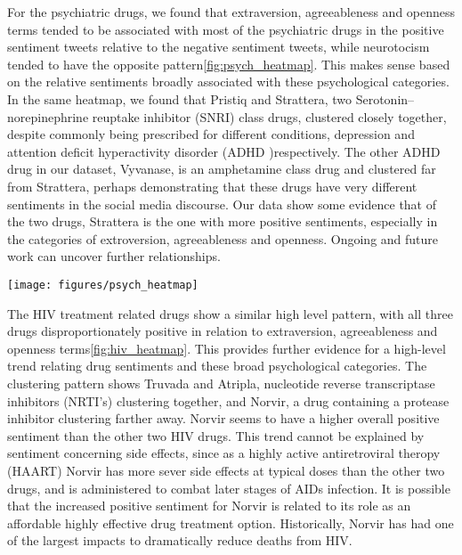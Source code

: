 For the psychiatric drugs, we found that extraversion, agreeableness and openness terms tended to be associated with most of the psychiatric drugs in the positive sentiment tweets relative to the negative sentiment tweets, while neurotocism tended to have the opposite pattern\ref{fig:psych_heatmap}. This makes sense based on the relative sentiments broadly associated with these psychological categories. In the same heatmap, we found that Pristiq and Strattera, two Serotonin–norepinephrine reuptake inhibitor (SNRI) class drugs\cite{howland2010potential}, clustered closely together, despite commonly being prescribed for different conditions, depression and attention deficit hyperactivity disorder (ADHD )respectively. The other ADHD drug in our dataset, Vyvanase, is an amphetamine class drug and clustered far from Strattera, perhaps demonstrating that these drugs have very different sentiments in the social media discourse. Our data show some evidence that of the two drugs, Strattera is the one with more positive sentiments, especially in the categories of extroversion, agreeableness and openness. Ongoing and future work can uncover further relationships.

\begin{figure*}
\centering
\texttt{[image: figures/psych\_heatmap]}
\caption{Relative similarity for psychiatric drug and personality keywords for positive sentiment tweets relative to negative sentiment tweets. The top 5 personality keywords associated with each of the following big 5 categories are shown in order: extraversion, agreeableness, conscientiousness, openness, neuroticism.}
\label{fig:psych_heatmap}
\end{figure*}

The HIV treatment related drugs show a similar high level pattern, with all three drugs disproportionately positive in relation to extraversion, agreeableness and openness terms\ref{fig:hiv_heatmap}. This provides further evidence for a high-level trend relating drug sentiments and these broad psychological categories. The clustering pattern shows Truvada and Atripla, nucleotide reverse transcriptase inhibitors (NRTI's) clustering together, and Norvir, a drug containing a protease inhibitor clustering farther away.  Norvir seems to have a higher overall positive sentiment than the other two HIV drugs. This trend cannot be explained by sentiment concerning side effects, since as a highly active antiretroviral theropy (HAART) Norvir has more sever side effects at typical doses than the other two drugs, and is administered to combat later stages of AIDs infection. It is possible that the increased positive sentiment for Norvir is related to its role as an affordable highly effective drug treatment option. Historically, Norvir has had one of the largest impacts to dramatically reduce deaths from HIV\cite{hogg1997decline}.

